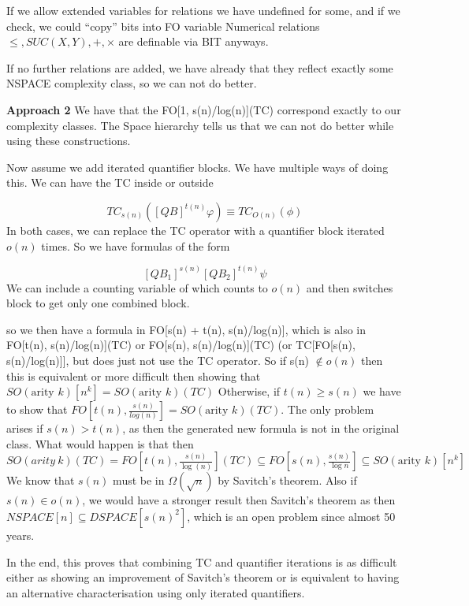 If we allow extended variables for relations we have undefined for some,
and if we check, we could ``copy'' bits into FO variable Numerical
relations \(\leq, SUC(X, Y), +, \times\) are definable via BIT anyways.

If no further relations are added, we have already that they reflect
exactly some NSPACE complexity class, so we can not do better.

\textbf{Approach 2} We have that the FO{[}1, s(n)/log(n){]}(TC)
correspond exactly to our complexity classes. The Space hierarchy tells
us that we can not do better while using these constructions.

Now assume we add iterated quantifier blocks. We have multiple ways of
doing this. We can have the TC inside or outside

\[
TC_{s(n)}([QB]^{t(n)}\varphi) \equiv TC_{O(n)}(\phi )
\] In both cases, we can replace the TC operator with a quantifier block
iterated \(o(n)\) times. So we have formulas of the form

\[
[QB_{1}]^{s(n)}[QB_{2}]^{t(n)} \psi
\] We can include a counting variable of which counts to \(o(n)\) and
then switches block to get only one combined block.

so we then have a formula in FO{[}s(n) + t(n), s(n)/log(n){]}, which is
also in FO{[}t(n), s(n)/log(n){]}(TC) or FO{[}s(n), s(n)/log(n){]}(TC)
(or TC{[}FO{[}s(n), s(n)/log(n){]}{]}, but does just not use the TC
operator. So if s(n) \(\not\in o(n)\) then this is equivalent or more
difficult then showing that
\(SO(\text{arity } k)[n^{k}] = SO(\text{arity } k)(TC)\) Otherwise, if
\(t(n) \geq s(n)\) we have to show that
\(FO\left[ t(n), \frac{s(n)}{log(n)} \right] = SO(\text{arity } k)(TC)\).
The only problem arises if \(s(n) > t(n)\), as then the generated new
formula is not in the original class. What would happen is that then
\(SO(arity~k)(TC) = FO\left[ t(n), \frac{s(n)}{\log(n)} \right](TC)\subseteq FO\left[ s(n), \frac{s(n)}{\log n} \right] \subseteq SO(\text{arity } k)[n^{k}]\)
We know that \(s(n)\) must be in \(\Omega(\sqrt{ n })\) by Savitch's
theorem. Also if \(s(n) \in o(n)\), we would have a stronger result then
Savitch's theorem as then \(NSPACE[n] \subseteq DSPACE[s(n)^2]\), which
is an open problem since almost 50 years.

In the end, this proves that combining TC and quantifier iterations is
as difficult either as showing an improvement of Savitch's theorem or is
equivalent to having an alternative characterisation using only iterated
quantifiers.


